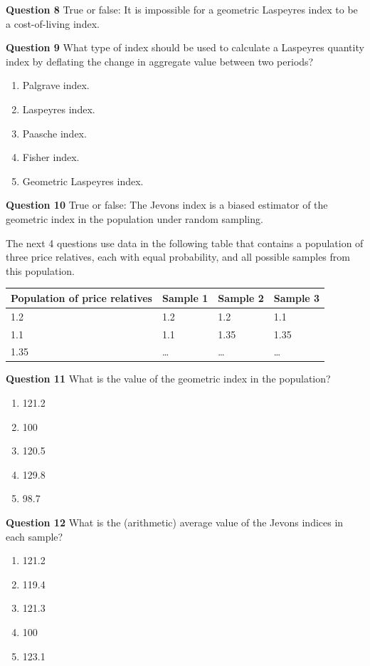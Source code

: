 \documentclass[]{article}
\begin{document}
\textbf{Question 8} True or false: It is impossible for a geometric Laspeyres index to be a cost-of-living index.

\textbf{Question 9} What type of index should be used to calculate a Laspeyres quantity index by deflating the change in aggregate value between two periods?

\begin{enumerate}
\def\labelenumi{\alph{enumi})}
\item
  Palgrave index.
\item
  Laspeyres index.
\item
  Paasche index.
\item
  Fisher index.
\item
  Geometric Laspeyres index.
\end{enumerate}

\textbf{Question 10} True or false: The Jevons index is a biased estimator of the geometric index in the population under random sampling.

The next 4 questions use data in the following table that contains a population of three price relatives, each with equal probability, and all possible samples from this population.

\begin{longtable}[]{@{}llll@{}}
\toprule
Population of price relatives & Sample 1 & Sample 2 & Sample 3\tabularnewline
\midrule
\endhead
1.2 & 1.2 & 1.2 & 1.1\tabularnewline
1.1 & 1.1 & 1.35 & 1.35\tabularnewline
1.35 & \ldots{} & \ldots{} & \ldots{}\tabularnewline
\bottomrule
\end{longtable}

\textbf{Question 11} What is the value of the geometric index in the population?

\begin{enumerate}
\def\labelenumi{\alph{enumi})}
\item
  121.2
\item
  100
\item
  120.5
\item
  129.8
\item
  98.7
\end{enumerate}

\textbf{Question 12} What is the (arithmetic) average value of the Jevons indices in each sample?

\begin{enumerate}
\def\labelenumi{\alph{enumi})}
\item
  121.2
\item
  119.4
\item
  121.3
\item
  100
\item
  123.1
\end{enumerate}
\end{document}
